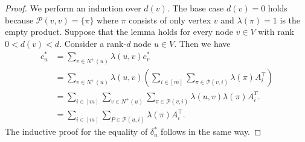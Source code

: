 \documentclass[11pt]{article}
\newcommand{\rb}[1]{\left(#1\right)}
\theoremstyle{remark}
\begin{document}
\begin{proof}
	We perform an induction over $d(v)$. The base case $d(v)=0$ holds because $\mathcal P(v,v) = \{\pi\}$ where $\pi$ consists of only vertex $v$ and $\lambda(\pi) = 1$ is the empty product.
	Suppose that the lemma holds for every node $v\in V$ with rank $0<d(v)<d$. Consider a rank-$d$ node $u\in V$. Then we have
\begin{align*}
    c^*_u 
    &= \sum_{v \in N^{+}(u)} \lambda(u,v) c^*_v \\
    &= \sum_{v \in N^{+}(u)} \lambda(u,v) \rb{\sum_{i \in [m]} \sum_{\pi \in \mathcal{P}(v,i)} \lambda(\pi) A^\intercal_i} \\
    &= \sum_{i \in [m]} \sum_{v \in N^{+}(u)} \sum_{\pi \in \mathcal{P}(v,i)} \lambda(u,v) \lambda(\pi) A_i^T. \\
    &= \sum_{i \in [m]} \sum_{P \in \mathcal{P}(u,i)} \lambda(\pi) A^\intercal_i.
\end{align*}
The inductive proof for the equality of $\delta_u^*$ follows in the same way.
\end{proof}
\end{document}
